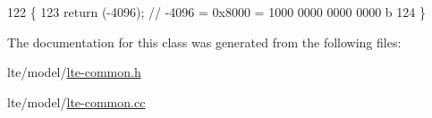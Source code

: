 \begin{DoxyCode}
122 \{
123   \textcolor{keywordflow}{return} (-4096);        \textcolor{comment}{// -4096 = 0x8000 = 1000 0000 0000 0000 b}
124 \}
\end{DoxyCode}


The documentation for this class was generated from the following files\+:\begin{DoxyCompactItemize}
\item 
lte/model/\hyperlink{lte-common_8h}{lte-\/common.\+h}\item 
lte/model/\hyperlink{lte-common_8cc}{lte-\/common.\+cc}\end{DoxyCompactItemize}
